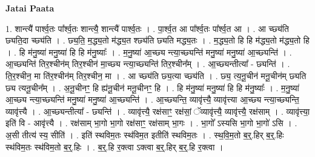 \documentclass[17pt]{extarticle}
\begin{document}
\textbf{Jatai Paata} \newline

1. शान्त्यै॑ पार्श्व॒तः पा᳚र्श्व॒तः शान्त्यै॒ शान्त्यै॑ पार्श्व॒तः । . पा॒र्श्व॒त आ पा᳚र्श्व॒तः पा᳚र्श्व॒त आ । . आ च्छ्य॑ति छ्यति॒दा च्छ्य॑ति । . छ्य॒ति॒ म॒द्ध्य॒तो म॑द्ध्य॒त श्छ्य॑ति छ्यति मद्ध्य॒तः । . म॒द्ध्य॒तो हि हि म॑द्ध्य॒तो म॑द्ध्य॒तो हि । . हि म॑नु॒ष्या॑ मनु॒ष्या॑ हि हि म॑नु॒ष्याः᳚ । . म॒नु॒ष्या॑ आ॒च्छ्य न्त्या॒च्छ्यन्ति॑ मनु॒ष्या॑ मनु॒ष्या॑ आ॒च्छ्यन्ति॑ । . आ॒च्छ्यन्ति॑ तिर॒श्चीन॑म् तिर॒श्चीन॑ मा॒च्छ्य न्त्या॒च्छ्यन्ति॑ तिर॒श्चीन᳚म् । . आ॒च्छ्यन्तीत्या᳚ - छ्यन्ति॑ । . ति॒र॒श्चीन॒ मा ति॑र॒श्चीन॑म् तिर॒श्चीन॒ मा । . आ च्छ्य॑ति छ्य॒त्या च्छ्य॑ति । . छ्य॒ त्य॒नू॒चीन॑ मनू॒चीन॑म् छ्यति छ्य त्यनू॒चीन᳚म् । . अ॒नू॒चीनꣳ॒॒ हि ह्य॑नू॒चीन॑ मनू॒चीनꣳ॒॒ हि । . हि म॑नु॒ष्या॑ मनु॒ष्या॑ हि हि म॑नु॒ष्याः᳚ । . म॒नु॒ष्या॑ आ॒च्छ्य न्त्या॒च्छ्यन्ति॑ मनु॒ष्या॑ मनु॒ष्या॑ आ॒च्छ्यन्ति॑ । . आ॒च्छ्यन्ति॒ व्यावृ॑त्त्यै॒ व्यावृ॑त्त्या आ॒च्छ्य न्त्या॒च्छ्यन्ति॒ व्यावृ॑त्त्यै । . आ॒च्छ्यन्तीत्या᳚ - छ्यन्ति॑ । . व्यावृ॑त्त्यै॒ रक्ष॑साꣳ॒॒ रक्ष॑सां॒ ॅव्यावृ॑त्त्यै॒ व्यावृ॑त्त्यै॒ रक्ष॑साम् । . व्यावृ॑त्त्या॒ इति॑ वि - आवृ॑त्त्यै । . रक्ष॑साम् भा॒गो भा॒गो रक्ष॑साꣳ॒॒ रक्ष॑साम् भा॒गः । . भा॒गो᳚ ऽस्यसि भा॒गो भा॒गो॑ ऽसि । . अ॒सी तीत्य॑ स्य॒ सीति॑ । . इति॑ स्थविम॒तः स्थ॑विम॒त इतीति॑ स्थविम॒तः । . स्थ॒वि॒म॒तो ब॒र्॒.हिर् ब॒र्॒.हिः स्थ॑विम॒तः स्थ॑विम॒तो ब॒र्॒.हिः । . ब॒र्॒.हि र॒क्त्वा ऽक्त्वा ब॒र्॒.हिर् ब॒र्॒.हि र॒क्त्वा । \newline
\end{document}
